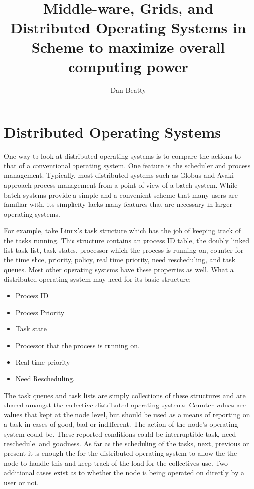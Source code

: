 \documentclass[11pt]{article}
\title{Middle-ware, Grids, and Distributed Operating Systems in Scheme to maximize overall computing power}
\author{Dan Beatty}
\begin{document}
\maketitle

\section {Distributed Operating Systems}
One way to look at distributed operating systems is to compare the actions to that of a conventional operating system.  One feature is the scheduler and process management.   Typically, most distributed systems such as Globus and Avaki approach process management from a point of view of a batch system.  While batch systems provide a simple and a convenient scheme that many users are familiar with, its simplicity lacks many features that are necessary in larger operating systems.  

For example, take Linux's task structure which has the job of keeping track of the tasks running.  This structure contains an process ID table, the doubly linked list task list, task states, processor which the process is running on, counter for the time slice, priority, policy, real time priority, need rescheduling, and task queues.  Most other operating systems have these properties as well.  What a distributed operating system may need for its basic structure:
\begin{itemize}
\item Process ID
\item Process Priority
\item Task state
\item Processor that the process is running on.
\item Real time priority
\item Need Rescheduling.
\end{itemize}
The task queues and task lists are simply collections of these structures and are shared amongst the collective distributed operating systems.   Counter values are values that kept at the node level, but should be used as a means of reporting on a task in cases of good, bad or indifferent.  The action of the node's operating system could be.  These reported conditions could be interruptible task,  need reschedule, and goodness.  As far as the scheduling of the tasks, next, previous or present it is enough the for the distributed operating system to allow the the node to handle this and keep track of the load for the collectives use.   Two additional cases exist as to whether the node is being operated on directly by  a user or not.   
\end{document}
